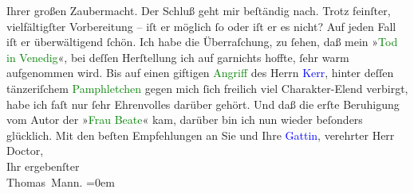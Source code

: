                     Ihrer großen Zaubermacht. Der Schluß geht mir beſtändig nach. Trotz feinſter,
                    vielfältigſter Vorbereitung – iſt er möglich ſo oder iſt er es nicht? Auf jeden
                    Fall iſt er überwältigend ſchön.\pend
           \pstart
           Ich habe die Überraſchung, zu ſehen, daß mein »\textcolor{green}{Tod
                        in Venedig}{}\ledrightnote{\textcolor{green}{Der Tod in Venedig}}«, bei deſſen Herſtellung ich {\pb}auf garnichts hoffte, ſehr warm
                    aufgenommen wird. Bis auf einen giftigen \textcolor{green}{Angriff}{} des Herrn \textcolor{blue}{Kerr}{}\ledrightnote{\textcolor{blue}{Alfred Kerr}}, hinter deſſen tänzeriſchem \textcolor{green}{Pamphletchen}{} gegen mich ſich freilich viel
                    Charakter-Elend verbirgt, habe ich faſt nur ſehr Ehrenvolles darüber gehört. Und
                    daß die erſte Beruhigung vom Autor der »\textcolor{green}{Frau
                        Beate}{}\ledrightnote{\textcolor{green}{Frau Beate und ihr Sohn. Novelle}}« kam, darüber bin ich nun wieder beſonders glücklich.\pend
           \pstart
           Mit den beſten Empfehlungen an Sie und Ihre \textcolor{blue}{Gattin}{}, verehrter Herr Doctor,{\\[\baselineskip]}Ihr ergebenſter{\\[\baselineskip]}\spacefill\mbox{Thomas Mann.}\pend
           \leftskip=0em{}\endnumbering{}  
      